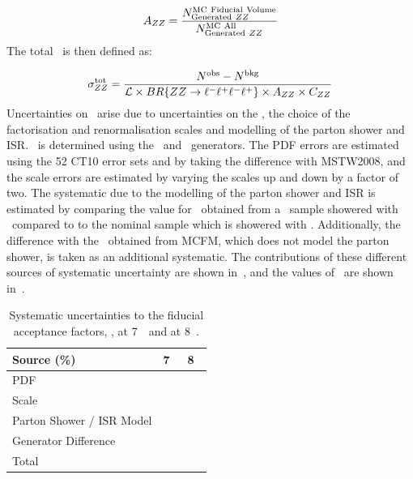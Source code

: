 \begin{equation}
\AZZ = \frac{ N^{\rm MC\ Fiducial\ Volume}_{{\rm Generated}\ ZZ} }{ N^{{\rm MC\
All}}_{{\rm Generated}\ ZZ} }
\end{equation}
The total \cx\ is then defined as:

\begin{equation}\label{eq:xsectot_fourl}
\sigma_{ZZ}^{\rm tot} = \frac{ N^{\rm obs} - N^{\rm bkg}}{\mathcal{L} \times
BR\{{ZZ\rightarrow\ell^{-}\ell^{+}\ell^{-}\ell^{+}}\} \times A_{ZZ} \times C_{ZZ}}
\end{equation}
Uncertainties on \AZZ\ arise due to uncertainties on the \partDF, the choice of
the factorisation and renormalisation scales and modelling of the parton shower
and ISR. \AZZ\ is determined using the \powhegbox\ and \ggtwoZZ\ generators. The
PDF errors are estimated using the 52 CT10 error sets and by taking the
difference with MSTW2008, and the scale errors are estimated by varying the scales
up and down by a factor of two. The systematic due to the modelling of the parton shower
and ISR is estimated by comparing the value for \AZZ\ obtained from a
\powhegbox\ sample showered with \herwig\ compared to to the nominal sample
which is showered with \pythia. Additionally, the difference with the \AZZ\
obtained from MCFM, which does not model the parton shower, is taken as an
additional systematic. The contributions of these different sources of
systematic uncertainty are shown in~\tab{azz-syst}, and the values of \AZZ\ are
shown in~\tab{azz}.

\begin{table}
\renewcommand\arraystretch{1.1}
\centering
\small
  \begin{tabular}{lll}
    \hline\hline
     Source (\%) & 7~\tev & 8~\tev \\
    \hline
     PDF  & \ZZSevenTeVAZZPDFUncPercentage\ & \ZZEightTeVAZZPDFUncPercentage \\
     Scale  & \ZZSevenTeVAZZScaleUncPercentage\ & \ZZEightTeVAZZScaleUncPercentage \\
     Parton Shower / ISR Model  & \ZZSevenTeVAZZISRUncPercentage\ & \ZZEightTeVAZZISRUncPercentage \\
     Generator Difference  & \ZZSevenTeVAZZGenUncPercentage\ & \ZZEightTeVAZZGenUncPercentage \\
     \hline
     Total  & \ZZSevenTeVAZZTotalUncPercentage\ & \ZZEightTeVAZZTotalUncPercentage \\
    \hline\hline
  \end{tabular}

      \caption[Systematic uncertainties to the fiducial acceptance factors, \AZZ, at 7~\tev\ and at 8~\tev.]
      { Systematic uncertainties to the fiducial acceptance factors, \AZZ, at
      7~\tev\ and at 8~\tev. }
    \label{table:azz-syst}
\renewcommand\arraystretch{1}
\end{table}


